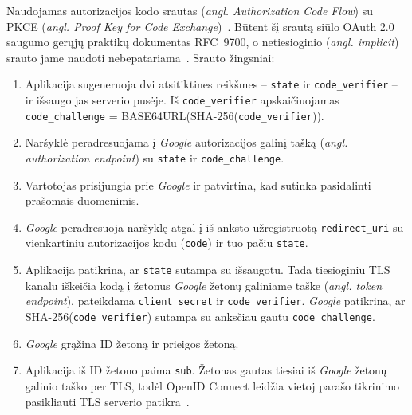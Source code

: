 Naudojamas autorizacijos kodo srautas (\textit{angl. Authorization Code Flow}) su PKCE (\textit{angl. Proof Key for Code Exchange})~\cite{rfc7636}. Būtent šį srautą siūlo OAuth 2.0 saugumo gerųjų praktikų dokumentas RFC~9700, o netiesioginio (\textit{angl. implicit}) srauto jame naudoti nebepatariama~\cite{rfc9700}. Srauto žingsniai:
\begin{enumerate}
    \item Aplikacija sugeneruoja dvi atsitiktines reikšmes -- \texttt{state} ir \texttt{code\_verifier} -- ir išsaugo jas serverio pusėje. Iš \texttt{code\_verifier} apskaičiuojamas \texttt{code\_challenge} = BASE64URL(SHA-256(\texttt{code\_verifier})).
    \item Naršyklė peradresuojama į \textit{Google} autorizacijos galinį tašką (\textit{angl. authorization endpoint}) su \texttt{state} ir \texttt{code\_challenge}.
    \item Vartotojas prisijungia prie \textit{Google} ir patvirtina, kad sutinka pasidalinti prašomais duomenimis.
    \item \textit{Google} peradresuoja naršyklę atgal į iš anksto užregistruotą \texttt{redirect\_uri} su vienkartiniu autorizacijos kodu (\texttt{code}) ir tuo pačiu \texttt{state}.
    \item Aplikacija patikrina, ar \texttt{state} sutampa su išsaugotu. Tada tiesioginiu TLS kanalu iškeičia kodą į žetonus \textit{Google} žetonų galiniame taške (\textit{angl. token endpoint}), pateikdama \texttt{client\_secret} ir \texttt{code\_verifier}. \textit{Google} patikrina, ar SHA-256(\texttt{code\_verifier}) sutampa su anksčiau gautu \texttt{code\_challenge}.
    \item \textit{Google} grąžina ID žetoną ir prieigos žetoną.
    \item Aplikacija iš ID žetono paima \texttt{sub}. Žetonas gautas tiesiai iš \textit{Google} žetonų galinio taško per TLS, todėl OpenID Connect leidžia vietoj parašo tikrinimo pasikliauti TLS serverio patikra~\cite{oidc_core}.
\end{enumerate}
